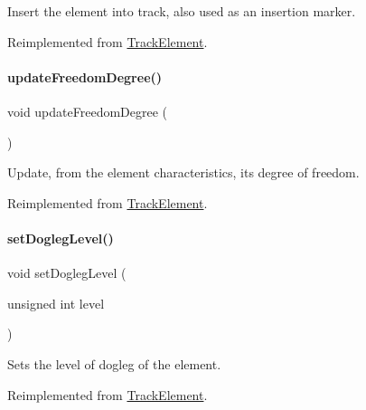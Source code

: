 Insert the element into {\ttfamily track}, also used as an insertion marker. 

Reimplemented from \hyperlink{classKite_1_1TrackElement_abd3d8093f871d3d1a7f24b053648026c}{Track\+Element}.

\mbox{\label{classKite_1_1TrackSegment_af5332d647c0482aa90ad7cc9b2a50f3a}} 
\paragraph{\texorpdfstring{update\+Freedom\+Degree()}{updateFreedomDegree()}}
{\footnotesize\ttfamily void update\+Freedom\+Degree (\begin{DoxyParamCaption}{ }\end{DoxyParamCaption})\hspace{0.3cm}{\ttfamily [virtual]}}

Update, from the element characteristics, it\textquotesingle{}s degree of freedom. 

Reimplemented from \hyperlink{classKite_1_1TrackElement_af5332d647c0482aa90ad7cc9b2a50f3a}{Track\+Element}.

\mbox{\label{classKite_1_1TrackSegment_a2b90319cb042b283aa5d1fdb1992f11f}} 
\paragraph{\texorpdfstring{set\+Dogleg\+Level()}{setDoglegLevel()}}
{\footnotesize\ttfamily void set\+Dogleg\+Level (\begin{DoxyParamCaption}\item[{unsigned int}]{level }\end{DoxyParamCaption})\hspace{0.3cm}{\ttfamily [virtual]}}

Sets the level of dogleg of the element. 

Reimplemented from \hyperlink{classKite_1_1TrackElement_a2b90319cb042b283aa5d1fdb1992f11f}{Track\+Element}.

